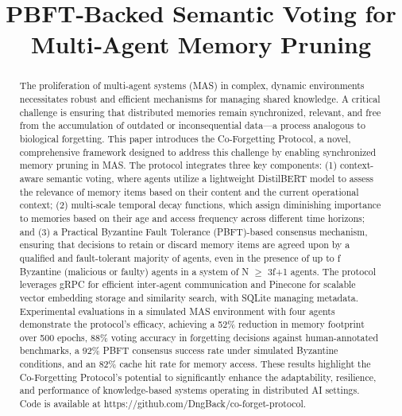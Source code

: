 \documentclass[conference]{IEEEtran}
\begin{document}
\title{PBFT‑Backed Semantic Voting for Multi‑Agent Memory Pruning}

\author{
}

\maketitle

\begin{abstract}
The proliferation of multi-agent systems (MAS) in complex, dynamic environments necessitates robust and efficient mechanisms for managing shared knowledge. A critical challenge is ensuring that distributed memories remain synchronized, relevant, and free from the accumulation of outdated or inconsequential data—a process analogous to biological forgetting. This paper introduces the Co-Forgetting Protocol, a novel, comprehensive framework designed to address this challenge by enabling synchronized memory pruning in MAS. The protocol integrates three key components: (1) context-aware semantic voting, where agents utilize a lightweight DistilBERT model to assess the relevance of memory items based on their content and the current operational context; (2) multi-scale temporal decay functions, which assign diminishing importance to memories based on their age and access frequency across different time horizons; and (3) a Practical Byzantine Fault Tolerance (PBFT)-based consensus mechanism, ensuring that decisions to retain or discard memory items are agreed upon by a qualified and fault-tolerant majority of agents, even in the presence of up to f Byzantine (malicious or faulty) agents in a system of N \(\geq\) 3f+1 agents. The protocol leverages gRPC for efficient inter-agent communication and Pinecone for scalable vector embedding storage and similarity search, with SQLite managing metadata. Experimental evaluations in a simulated MAS environment with four agents demonstrate the protocol’s efficacy, achieving a 52\% reduction in memory footprint over 500 epochs, 88\% voting accuracy in forgetting decisions against human-annotated benchmarks, a 92\% PBFT consensus success rate under simulated Byzantine conditions, and an 82\% cache hit rate for memory access. These results highlight the Co-Forgetting Protocol’s potential to significantly enhance the adaptability, resilience, and performance of knowledge-based systems operating in distributed AI settings. Code is available at https://github.com/DngBack/co-forget-protocol.
\end{abstract}
\end{document}
